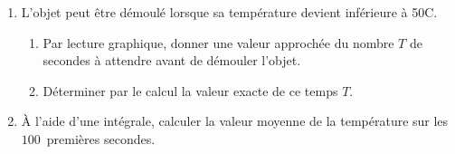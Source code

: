 \begin{enumerate}
\item L'objet peut être démoulé lorsque sa température devient inférieure à 50\degres C. 
	\begin{enumerate}
		\item Par lecture graphique, donner une valeur approchée du nombre $T$ de
secondes à attendre avant de démouler l'objet.
		\item Déterminer par le calcul la valeur exacte de ce temps $T$.
	\end{enumerate}	
\item À l'aide d'une intégrale, calculer la valeur moyenne de la température sur les $100$~premières secondes.
\end{enumerate}

\bigskip

